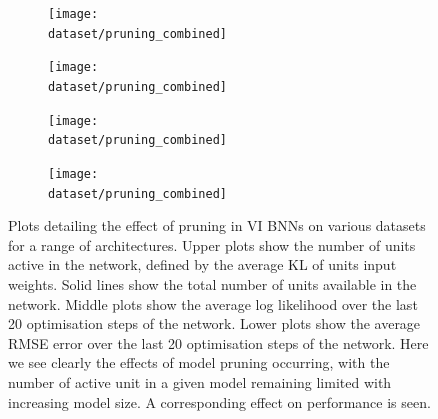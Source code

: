\begin{figure}[ph]
	\def\dataset{\bostonvar}
	\def\dataname{\bostonname}
	\begin{subfigure}{0.48\textwidth}
		\texttt{[image: \\dataset/pruning\_combined]}
		\caption{\dataname}
		\label{fig:pruning_\dataset}
	\end{subfigure}
	\def\dataset{\concretevar}
	\def\dataname{\concretename}
	\begin{subfigure}{0.48\textwidth}
		\texttt{[image: \\dataset/pruning\_combined]}
		\caption{\dataname}
		\label{fig:pruning_\dataset}
	\end{subfigure}
	
	\def\dataset{\energyvar}
	\def\dataname{\energyname}
	\begin{subfigure}{0.48\textwidth}
		\texttt{[image: \\dataset/pruning\_combined]}
		\caption{\dataname}
		\label{fig:pruning_\dataset}
	\end{subfigure}
	\def\dataset{\kinvar}
	\def\dataname{\kinname}
	\begin{subfigure}{0.48\textwidth}
		\texttt{[image: \\dataset/pruning\_combined]}
		\caption{\dataname}
		\label{fig:pruning_\dataset}
	\end{subfigure}
	\caption{Plots detailing the effect of pruning in VI BNNs on various datasets for a range of architectures. Upper plots show the number of units active in the network, defined by the average KL of units input weights. Solid lines show the total number of units available in the network. Middle plots show the average log likelihood over the last 20 optimisation steps of the network. Lower plots show the average RMSE error over the last 20 optimisation steps of the network. Here we see clearly the effects of model pruning occurring, with the number of active unit in a given model remaining limited with increasing model size. A corresponding effect on performance is seen.}
	\label{fig:pruning_1}
\end{figure}

